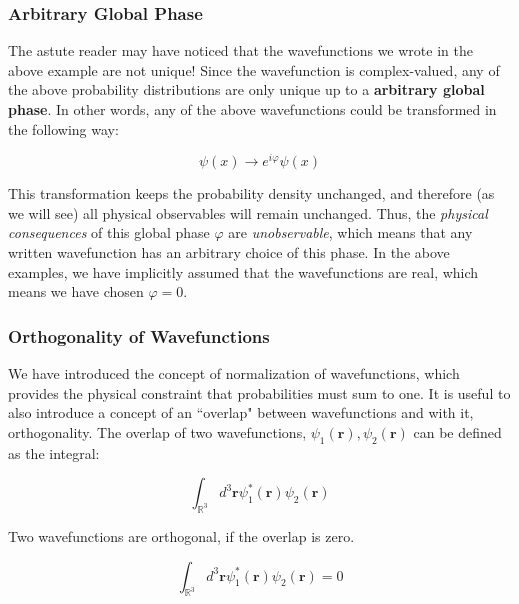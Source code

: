 \subsubsection{Arbitrary Global Phase}

The astute reader may have noticed that the wavefunctions we wrote in the above example are not unique! Since the wavefunction is complex-valued, any of the above probability distributions are only unique up to a \textbf{arbitrary global phase}. In other words, any of the above wavefunctions could be transformed in the following way:

\begin{equation}
	\psi(x) \to e^{i\varphi}\psi(x)
\end{equation}

This transformation keeps the probability density unchanged, and therefore (as we will see) all physical observables will remain unchanged. Thus, the \textit{physical consequences} of this global phase $\varphi$ are \textit{unobservable}, which means that any written wavefunction has an arbitrary choice of this phase. In the above examples, we have implicitly assumed that the wavefunctions are real, which means we have chosen $\varphi = 0 $.


\subsubsection{Orthogonality of Wavefunctions}

We have introduced the concept of normalization of wavefunctions, which provides the physical constraint that probabilities must sum to one. It is useful to also introduce a concept of an ``overlap" between wavefunctions and with it, orthogonality. The overlap of two wavefunctions, $\psi_1(\mathbf{r}), \psi_2(\mathbf{r})$ can be defined as the integral:

\begin{equation}
	\int_{\mathbb{R}^3} d^3\mathbf{r} \psi_1^*(\mathbf{r})\psi_2(\mathbf{r}) 
\end{equation}

Two wavefunctions are orthogonal, if the overlap is zero.

\begin{equation}
	\int_{\mathbb{R}^3} d^3\mathbf{r} \psi_1^*(\mathbf{r})\psi_2(\mathbf{r}) = 0 
\end{equation}

